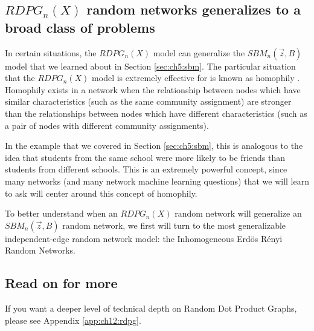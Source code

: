 \subsection{$RDPG_n(X)$ random networks generalizes to a broad class of problems}

In certain situations, the $RDPG_n(X)$ model can generalize the $SBM_n(\vec z, B)$ model that we learned about in Section \ref{sec:ch5:sbm}. The particular situation that the $RDPG_n(X)$ model is extremely effective for is known as {homophily} \cite{Hoff2007Dec,Athreya2017Jan}. Homophily exists in a network when the relationship between nodes which have similar characteristics (such as the same community assignment) are stronger than the relationships between nodes which have different characteristics (such as a pair of nodes with different community assignments). 

In the example that we covered in Section \ref{sec:ch5:sbm}, this is analogous to the idea that students from the same school were more likely to be friends than students from different schools. This is an extremely powerful concept, since many networks (and many network machine learning questions) that we will learn to ask will center around this concept of homophily.

To better understand when an $RDPG_n(X)$ random network will generalize an $SBM_n(\vec z, B)$ random network, we first will turn to the most generalizable independent-edge random network model: the Inhomogeneous Erd\"os R\'enyi Random Networks.

\subsection{Read on for more}

If you want a deeper level of technical depth on Random Dot Product Graphs, please see Appendix \ref{app:ch12:rdpg}.


\newpage